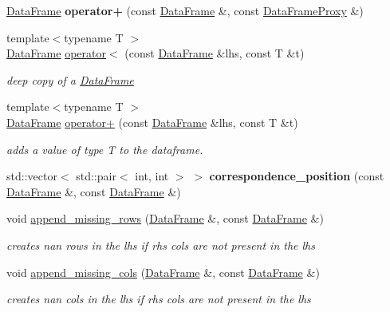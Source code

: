 \begin{DoxyCompactItemize}
\hyperlink{classDataFrame}{Data\+Frame} {\bfseries operator+} (const \hyperlink{classDataFrame}{Data\+Frame} \&, const \hyperlink{classDataFrame_1_1DataFrameProxy}{Data\+Frame\+Proxy} \&)
\item 
{\footnotesize template$<$typename T $>$ }\\\hyperlink{classDataFrame}{Data\+Frame} \hyperlink{classDataFrame_a8c08b940f5d6a095ac079ef277133c1a}{operator$<$} (const \hyperlink{classDataFrame}{Data\+Frame} \&lhs, const T \&t)
\begin{DoxyCompactList}\small\item\em deep copy of a \hyperlink{classDataFrame}{Data\+Frame} \end{DoxyCompactList}\item 
{\footnotesize template$<$typename T $>$ }\\\hyperlink{classDataFrame}{Data\+Frame} \hyperlink{classDataFrame_af0bd28935e605ba646d407b02e0a5850}{operator+} (const \hyperlink{classDataFrame}{Data\+Frame} \&lhs, const T \&t)
\begin{DoxyCompactList}\small\item\em adds a value of type T to the dataframe. \end{DoxyCompactList}\item 
\mbox{\label{classDataFrame_a425d7127fe7def6529cd4e6a6c1ec11f}} 
std\+::vector$<$ std\+::pair$<$ int, int $>$ $>$ {\bfseries correspondence\+\_\+position} (const \hyperlink{classDataFrame}{Data\+Frame} \&, const \hyperlink{classDataFrame}{Data\+Frame} \&)
\item 
void \hyperlink{classDataFrame_a221d3063f94569b545fe4c3ae56597e8}{append\+\_\+missing\+\_\+rows} (\hyperlink{classDataFrame}{Data\+Frame} \&, const \hyperlink{classDataFrame}{Data\+Frame} \&)
\begin{DoxyCompactList}\small\item\em creates nan rows in the lhs if rhs cols are not present in the lhs \end{DoxyCompactList}\item 
void \hyperlink{classDataFrame_a27cc8acd51a5cd40e6a2726368914661}{append\+\_\+missing\+\_\+cols} (\hyperlink{classDataFrame}{Data\+Frame} \&, const \hyperlink{classDataFrame}{Data\+Frame} \&)
\begin{DoxyCompactList}\small\item\em creates nan cols in the lhs if rhs cols are not present in the lhs \end{DoxyCompactList}\end{DoxyCompactItemize}


